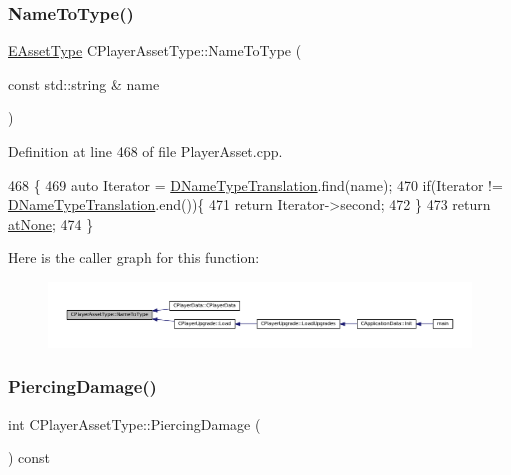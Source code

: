 \subsubsection{\texorpdfstring{Name\+To\+Type()}{NameToType()}}
{\footnotesize\ttfamily \hyperlink{GameDataTypes_8h_a5600d4fc433b83300308921974477fec}{E\+Asset\+Type} C\+Player\+Asset\+Type\+::\+Name\+To\+Type (\begin{DoxyParamCaption}\item[{const std\+::string \&}]{name }\end{DoxyParamCaption})\hspace{0.3cm}{\ttfamily [static]}}



Definition at line 468 of file Player\+Asset.\+cpp.


\begin{DoxyCode}
468                                                             \{
469     \textcolor{keyword}{auto} Iterator = \hyperlink{classCPlayerAssetType_a4e7728e5316eb5c1124dcac90f5290d5}{DNameTypeTranslation}.find(name);
470     \textcolor{keywordflow}{if}(Iterator != \hyperlink{classCPlayerAssetType_a4e7728e5316eb5c1124dcac90f5290d5}{DNameTypeTranslation}.end())\{
471         \textcolor{keywordflow}{return} Iterator->second;
472     \}
473     \textcolor{keywordflow}{return} \hyperlink{GameDataTypes_8h_a5600d4fc433b83300308921974477feca82fb51718e2c00981a2d37bc6fe92593}{atNone};
474 \}
\end{DoxyCode}
Here is the caller graph for this function\+:
\nopagebreak
\begin{figure}[H]
\begin{center}
\leavevmode
\includegraphics[width=350pt]{classCPlayerAssetType_a42d55b6d7606e021c063fce3a14c56de_icgraph}
\end{center}
\end{figure}
\hypertarget{classCPlayerAssetType_a0ccf10706b29374191644fb6ef2d4132}{}\label{classCPlayerAssetType_a0ccf10706b29374191644fb6ef2d4132} 
\subsubsection{\texorpdfstring{Piercing\+Damage()}{PiercingDamage()}}
{\footnotesize\ttfamily int C\+Player\+Asset\+Type\+::\+Piercing\+Damage (\begin{DoxyParamCaption}{ }\end{DoxyParamCaption}) const\hspace{0.3cm}{\ttfamily [inline]}}



